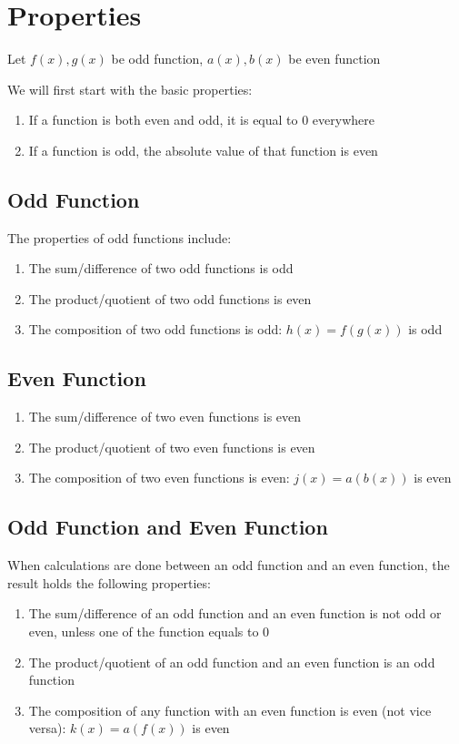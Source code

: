 \documentclass{article}
\numberwithin{equation}{section}
\begin{document}
\section{Properties}
Let $f(x), g(x)$ be odd function, $a(x), b(x)$ be even function

We will first start with the basic properties:
\begin{enumerate}
    \item If a function is both even and odd, it is equal to $0$ everywhere
    \item If a function is odd, the absolute value of that function is even
\end{enumerate}
\subsection{Odd Function}
The properties of odd functions include:
\begin{enumerate}
    \item The sum/difference of two odd functions is odd
    \item The product/quotient of two odd functions is even
    \item The composition of two odd functions is odd: $h(x) = f(g(x))$ is odd
\end{enumerate}
\subsection{Even Function}
\begin{enumerate}
    \item The sum/difference of two even functions is even
    \item The product/quotient of two even functions is even
    \item The composition of two even functions is even: $j(x) = a(b(x))$ is even
\end{enumerate}

\subsection{Odd Function and Even Function}
When calculations are done between an odd function and an even function, the result holds the following properties:
\begin{enumerate}
    \item The sum/difference of an odd function and an even function is not odd or even, unless one of the function equals to $0$
    \item The product/quotient of an odd function and an even function is an odd function
    \item The composition of any function with an even function is even (not vice versa): $k(x) = a(f(x))$ is even
\end{enumerate}
\end{document}
